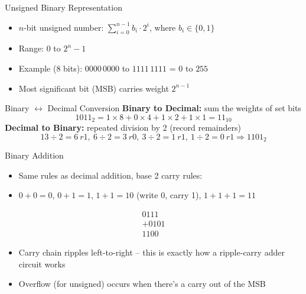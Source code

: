 \documentclass[10pt, aspectratio=169]{beamer}
\begin{document}
\begin{frame}{Unsigned Binary Representation}
\begin{itemize}
    \item $n$-bit unsigned number: $\sum_{i=0}^{n-1} b_i \cdot 2^i$, where $b_i \in \{0,1\}$
    \item Range: $0$ to $2^n - 1$
    \item Example (8 bits): $0000\,0000$ to $1111\,1111$ = $0$ to $255$
    \item Most significant bit (MSB) carries weight $2^{n-1}$
\end{itemize}
\end{frame}

\begin{frame}{Binary $\leftrightarrow$ Decimal Conversion}
\textbf{Binary to Decimal:} sum the weights of set bits
\[
1011_2 = 1\times8 + 0\times4 + 1\times2 + 1\times1 = 11_{10}
\]
\textbf{Decimal to Binary:} repeated division by 2 (record remainders)
\[
13 \div 2 = 6\ r1,\ 6 \div 2 = 3\ r0,\ 3 \div 2 = 1\ r1,\ 1 \div 2 = 0\ r1 \Rightarrow 1101_2
\]
\end{frame}

\begin{frame}{Binary Addition}
\begin{itemize}
    \item Same rules as decimal addition, base 2 carry rules:
    \item $0+0=0$, \quad $0+1=1$, \quad $1+1=10$ (write 0, carry 1), \quad $1+1+1=11$
\end{itemize}
\[
\begin{array}{r}
 0111 \\
+0101 \\
\hline
 1100
\end{array}
\]
\begin{itemize}
    \item Carry chain ripples left-to-right -- this is exactly how a ripple-carry adder circuit works
    \item Overflow (for unsigned) occurs when there's a carry out of the MSB
\end{itemize}
\end{frame}
\end{document}
